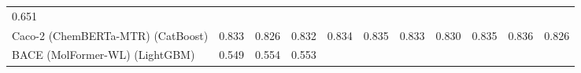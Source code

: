 \documentclass[
  10pt,
]{article}
\begin{document}
\begin{longtable}[]{@{}lllllllllll@{}}
\begin{minipage}[t]{0.07\columnwidth}
0.651\strut
\end{minipage}\tabularnewline
\begin{minipage}[t]{0.07\columnwidth}\raggedright
Caco-2 (ChemBERTa-MTR) (CatBoost)\strut
\end{minipage} & \begin{minipage}[t]{0.07\columnwidth}\raggedright
0.833\strut
\end{minipage} & \begin{minipage}[t]{0.07\columnwidth}\raggedright
0.826\strut
\end{minipage} & \begin{minipage}[t]{0.07\columnwidth}\raggedright
0.832\strut
\end{minipage} & \begin{minipage}[t]{0.07\columnwidth}\raggedright
0.834\strut
\end{minipage} & \begin{minipage}[t]{0.07\columnwidth}\raggedright
0.835\strut
\end{minipage} & \begin{minipage}[t]{0.07\columnwidth}\raggedright
0.833\strut
\end{minipage} & \begin{minipage}[t]{0.07\columnwidth}\raggedright
0.830\strut
\end{minipage} & \begin{minipage}[t]{0.07\columnwidth}\raggedright
0.835\strut
\end{minipage} & \begin{minipage}[t]{0.07\columnwidth}\raggedright
0.836\strut
\end{minipage} & \begin{minipage}[t]{0.07\columnwidth}\raggedright
0.826\strut
\end{minipage}\tabularnewline
\begin{minipage}[t]{0.07\columnwidth}\raggedright
BACE (MolFormer-WL) (LightGBM)\strut
\end{minipage} & \begin{minipage}[t]{0.07\columnwidth}\raggedright
0.549\strut
\end{minipage} & \begin{minipage}[t]{0.07\columnwidth}\raggedright
0.554\strut
\end{minipage} & \begin{minipage}[t]{0.07\columnwidth}\raggedright
0.553\strut
\end{minipage} & \begin{minipage}[t]{0.07\columnwidth}\raggedright

\end{minipage}
\end{longtable}
\end{document}
